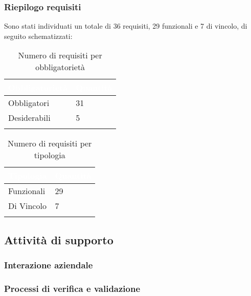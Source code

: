 \subsubsection{Riepilogo requisiti}
Sono stati individuati un totale di 36 requisiti, 29 funzionali e 7 di vincolo, di seguito schematizzati:
{
    \setlength{\freewidth}{\dimexpr\textwidth-10\tabcolsep}
    \renewcommand{\arraystretch}{1.5}
    \centering
    \setlength{\aboverulesep}{0pt}
    \setlength{\belowrulesep}{0pt}
    \begin{longtable}{C{.25\freewidth} C{.2\freewidth}} 
       \toprule
    \textcolor{white}{\textbf{Obbligatorietà}}&
    \textcolor{white}{\textbf{Quantità}}\\
    \toprule
    \endhead

    Obbligatori & 31\\
    Desiderabili & 5\\
    \bottomrule
    \caption{Numero di requisiti per obbligatorietà}
    \label{tab:requisiti-obbligatorieta}
    \end{longtable}
}

{
    \setlength{\freewidth}{\dimexpr\textwidth-10\tabcolsep}
    \renewcommand{\arraystretch}{1.5}
    \centering
    \setlength{\aboverulesep}{0pt}
    \setlength{\belowrulesep}{0pt}
    \begin{longtable}{C{.25\freewidth} C{.2\freewidth}} 
       \toprule
    \textcolor{white}{\textbf{Tipologia}}&
    \textcolor{white}{\textbf{Quantità}}\\
    \toprule
    \endhead

    Funzionali & 29\\
    Di Vincolo & 7\\
    \bottomrule
    \caption{Numero di requisiti per tipologia}
    \label{tab:requisiti-tipolgia}
    \end{longtable}
}

\subsection{Attività di supporto}
\subsubsection{Interazione aziendale}
\subsubsection{Processi di verifica e validazione}
